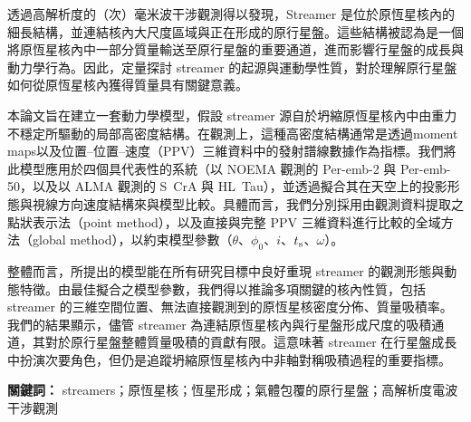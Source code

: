 透過高解析度的（次）毫米波干涉觀測得以發現，Streamer 是位於原恆星核內的細長結構，並連結核內大尺度區域與正在形成的原行星盤。這些結構被認為是一個將原恆星核內中一部分質量輸送至原行星盤的重要通道，進而影響行星盤的成長與動力學行為。因此，定量探討 streamer 的起源與運動學性質，對於理解原行星盤如何從原恆星核內獲得質量具有關鍵意義。

本論文旨在建立一套動力學模型，假設 streamer 源自於坍縮原恆星核內中由重力不穩定所驅動的局部高密度結構。在觀測上，這種高密度結構通常是透過moment maps以及位置–位置–速度（PPV）三維資料中的發射譜線數據作為指標。我們將此模型應用於四個具代表性的系統（以 NOEMA 觀測的 Per-emb-2 與 Per-emb-50，以及以 ALMA 觀測的 S~CrA 與 HL~Tau），並透過擬合其在天空上的投影形態與視線方向速度結構來與模型比較。具體而言，我們分別採用由觀測資料提取之點狀表示法（point method），以及直接與完整 PPV 三維資料進行比較的全域方法（global method），以約束模型參數（$\theta$、$\phi_0$、$i$、$t_{\rm s}$、$\omega$）。

整體而言，所提出的模型能在所有研究目標中良好重現 streamer 的觀測形態與動態特徵。由最佳擬合之模型參數，我們得以推論多項關鍵的核內性質，包括 streamer 的三維空間位置、無法直接觀測到的原恆星核密度分佈、質量吸積率。我們的結果顯示，儘管 streamer 為連結原恆星核內與行星盤形成尺度的吸積通道，其對於原行星盤整體質量吸積的貢獻有限。這意味著 streamer 在行星盤成長中扮演次要角色，但仍是追蹤坍縮原恆星核內中非軸對稱吸積過程的重要指標。

\vspace{1em}
\noindent\textbf{關鍵詞：} streamers；原恆星核；恆星形成；氣體包覆的原行星盤；高解析度電波干涉觀測